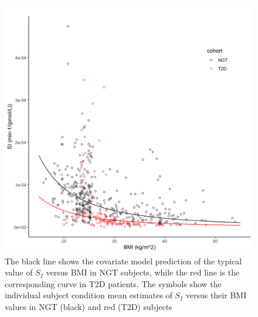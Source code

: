 \documentclass[utf8]{frontiersSCNS} %
\begin{document}
\begin{figure}[h!]
\begin{center}
\includegraphics[width=15cm]{SI_BMI.PNG}
\end{center}
\caption{The black line shows the covariate model prediction of the typical value of $S_I$ versus BMI in NGT subjects, while the red line is the corresponding curve in T2D patients. The symbols show the individual subject condition mean estimates of $S_I$ versus their BMI values in NGT (black) and red (T2D) subjects}
\label{fig: SI_BMI}
\end{figure}
\end{document}
